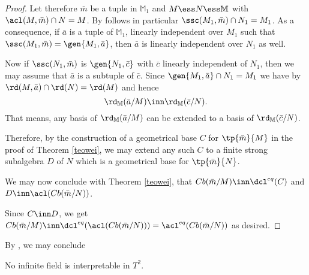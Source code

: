 \documentclass[11pt,english]{article}
\begin{document}
\begin{proof}
\medskip
Let therefore $\bar m$ be a tuple in $\mathbb{M}_{1}$ and $M\ess N\ess\mathbb{M}$ with
$\acl(M,\bar m)\cap N=M$. 
By  follows in particular $\ssc(M_{1},\bar m)\cap N_{1}=M_{1}$.
As a consequence, if $\bar a$ is
a tuple of $\mathbb{M}_{1}$, linearly independent over $M_{1}$ such that $\ssc(M_{1},\bar m)=\gen{M_{1},\bar a}$,
then $\bar a$ is linearly independent over $N_{1}$ as well.

Now if $\ssc(N_{1},\bar m)$ is $\gen{N_{1},\bar c}$ with $\bar c$ linearly independent of $N_{1}$,
then we may assume that $\bar a$ is a subtuple of $\bar c$. Since $\gen{M_{1},\bar a}\cap N_{1}=M_{1}$ we have
by  $\rd(M,\bar a)\cap\rd(N)=\rd(M)$ and hence
$$\rd_{\mathbb{M}}(\bar a/M)\inn\rd_{\mathbb{M}}(\bar c/N).$$
That means, any basis of $\rd_{\mathbb{M}}(\bar a/M)$ can be extended to a basis of $\rd_{\mathbb{M}}(\bar c/N)$.

Therefore, by the construction of a geometrical base $C$ for $\tp{\bar m}{M}$ in the proof of Theorem \ref{teowei},
we may extend any such $C$ to a finite strong subalgebra $D$ of $N$ which is a geometrical base for $\tp{\bar m}{N}$.

%

We may now conclude with Theorem \ref{teowei}, that
$Cb(\bar m/M)\inn\dcl^{eq}(C)$ and $D\inn\acl(Cb(\bar m/N))$.

%
%
%

Since $C\inn D$, we get $Cb(\bar m/M)\inn\dcl^{eq}(\acl(Cb(\bar m/N)))=\acl^{eq}(Cb(\bar m/N))$ as desired.
\end{proof}

By \cite[Proposition 3.2]{pilcm}, we may conclude
\begin{cor}
No infinite field is interpretable in $T^{2}$.
\end{cor}
\end{document}
